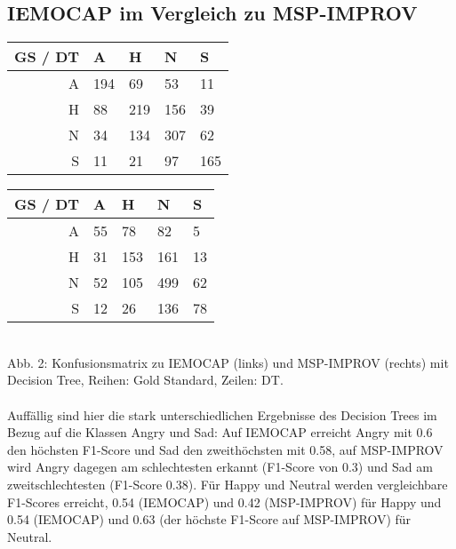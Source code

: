 \documentclass{article} %
\begin{document}
\subsection{IEMOCAP im Vergleich zu MSP-IMPROV}
\begin{tabular}{|r|llll|}
\hline
GS / DT & A & H & N & S \\
\hline
A & 194 & 69 & 53 & 11 \\
H & 88 & 219 & 156 & 39 \\
N & 34 & 134 & 307 & 62 \\
S & 11 & 21 & 97 & 165 \\
\hline
\end{tabular}
\begin{tabular}{|r|llll|}
\hline
GS / DT & A & H & N & S \\
\hline
A & 55 & 78 & 82 & 5 \\
H & 31 & 153 & 161 & 13 \\
N & 52 & 105 & 499 & 62 \\
S & 12 & 26 & 136 & 78 \\
\hline
\end{tabular} \\
Abb. 2: Konfusionsmatrix zu IEMOCAP (links) und MSP-IMPROV (rechts) mit Decision Tree, Reihen: Gold Standard, Zeilen: DT. \\ \\
Auffällig sind hier die stark unterschiedlichen Ergebnisse des Decision Trees im Bezug auf die Klassen Angry und Sad: Auf IEMOCAP erreicht Angry mit 0.6 den höchsten F1-Score und Sad den zweithöchsten mit 0.58, auf MSP-IMPROV wird Angry dagegen am schlechtesten erkannt (F1-Score von 0.3) und Sad am zweitschlechtesten (F1-Score 0.38). Für Happy und Neutral werden vergleichbare F1-Scores erreicht, 0.54 (IEMOCAP) und 0.42 (MSP-IMPROV) für Happy und 0.54 (IEMOCAP) und 0.63 (der höchste F1-Score auf MSP-IMPROV) für Neutral. 
\end{document}
